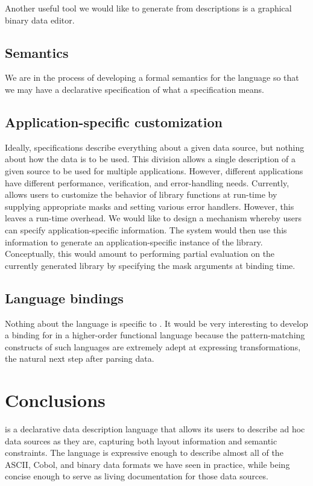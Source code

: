 \documentclass{sig-alternate}
\begin{document}
Another useful tool we 
would like to generate from \pads{} descriptions is a graphical binary data editor. 

\subsection{Semantics}  We are in the process of developing a formal semantics for the \pads{} language so that we may have a declarative specification of what a \pads{} specification means.

\subsection{Application-specific customization}
Ideally, \pads{} specifications describe everything about a given
data source, but nothing about how the data is to be used. This
division allows a single description of a given source to be used
for multiple applications.  However, different applications have different
performance, verification, and error-handling needs.  Currently,
\pads{} allows users to customize the behavior of library
functions at run-time by supplying appropriate masks and setting various error handlers.  However, this leaves a run-time overhead.  We would like to 
design a mechanism whereby users can specify application-specific information.  The \pads{} system would then use this information to generate an 
application-specific instance of the library.  Conceptually, this would
amount to performing partial evaluation on the currently generated \pads{} library by specifying the mask arguments at binding time.

\subsection{Language bindings}  Nothing about the \pads{} language is specific to \C{}.  It would be very interesting to develop a binding for \pads{} in a higher-order functional language because the pattern-matching constructs of such languages are extremely adept at expressing transformations, the natural next step after parsing data.


\section{Conclusions}
\pads{} is a declarative data description language that allows 
its users to describe ad hoc data sources as they are, capturing
both layout information and semantic constraints.  The language
is expressive enough to describe almost all of the ASCII, Cobol, 
and binary data formats we have seen in practice, while being 
concise enough to serve as living documentation for those data sources.  
\end{document}
